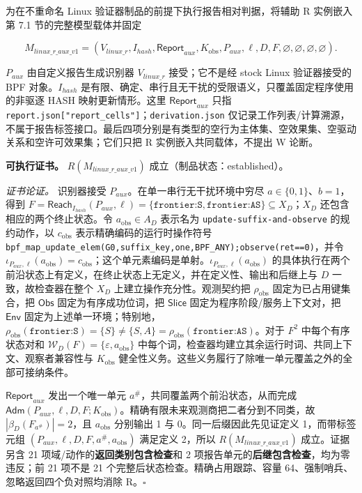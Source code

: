 \documentclass[
  11pt,
  a4paper,
]{ctexart}
\begin{document}
为在不重命名 Linux 验证器制品的前提下执行报告相对判据，将辅助 R
实例嵌入第 7.1 节的完整模型载体并固定

\[M_{\mathit{linux\_r\_aux\_v1}}=
(V_{\mathit{linux\_r}},I_{\mathit{hash}},\mathsf{Report}_{\mathit{aux}},
K_{\mathrm{obs}},P_{\mathit{aux}},\ell,D,F,
\varnothing,\varnothing,\varnothing,\varnothing).\]

\(P_{\mathit{aux}}\) 由自定义报告生成识别器 \(V_{\mathit{linux\_r}}\)
接受；它不是经 stock Linux 验证器接受的 BPF 对象。\(I_{\mathit{hash}}\)
是有限、确定、串行且无干扰的受限语义，只覆盖固定程序使用的非驱逐 HASH
映射更新情形。这里 \(\mathsf{Report}_{\mathit{aux}}\) 只指
\texttt{report.json{[}"report\_cells"{]}}；\texttt{derivation.json}
仅记录工作列表/计算溯源，不属于报告标签接口。最后四项分别是有类型的空行为主体集、空效果集、空驱动关系和空许可效果集；它们只把
R 实例嵌入共同载体，不提出 W 论断。

\textbf{可执行证书。} \(R(M_{\mathit{linux\_r\_aux\_v1}})\)
成立（制品状态：established）。

\emph{证书论证。} 识别器接受
\(P_{\mathit{aux}}\)。在单一串行无干扰环境中穷尽
\(a\in\{0,1\}\)、\(b=1\)，得到
\(F=\mathsf{Reach}_{I_{\mathit{hash}}}(P_{\mathit{aux}},\ell)
=\{\texttt{frontier:S},\texttt{frontier:AS}\}\subseteq X_D\)；\(X_D\)
还包含相应的两个终止状态。令 \(a_{\mathrm{obs}}\in A_D\) 表示名为
\texttt{update-suffix-and-observe} 的规约动作，以 \(c_{\mathrm{obs}}\)
表示精确编码的运行时操作符号
\texttt{bpf\_map\_update\_elem(G0,suffix\_key,one,BPF\_ANY);observe(ret==0)}，并令
\(\iota_{P_{\mathit{aux}},\ell}(a_{\mathrm{obs}})=c_{\mathrm{obs}}\)；这个单元素编码是单射。\(\iota_{P_{\mathit{aux}},\ell}(a_{\mathrm{obs}})\)
的具体执行在两个前沿状态上有定义，在终止状态上无定义，并在定义性、输出和后继上与
\(D\) 一致，故检查器在整个 \(X_D\) 上建立操作充分性。观测契约把
\(\rho_{\mathrm{obs}}\) 固定为已占用键集合，把 \(\mathsf{Obs}\)
固定为有序成功位词，把 \(\mathsf{Slice}\)
固定为程序阶段/服务上下文对，把 \(\mathsf{Env}\)
固定为上述单一环境；特别地，\(\rho_{\mathrm{obs}}(\texttt{frontier:S})=\{S\}\ne\{S,A\}=\rho_{\mathrm{obs}}(\texttt{frontier:AS})\)。对于
\(F^2\) 中每个有序状态对和
\(\mathcal W_D(F)=\{\varepsilon,a_{\mathrm{obs}}\}\)
中每个词，检查器均建立其余运行时词、共同上下文、观察者兼容性与
\(K_{\mathrm{obs}}\)
健全性义务。这些义务履行了除唯一单元覆盖之外的全部可接纳条件。

\(\mathsf{Report}_{\mathit{aux}}\) 发出一个唯一单元
\(a^\#\)，共同覆盖两个前沿状态，从而完成
\(\mathsf{Adm}(P_{\mathit{aux}},\ell,D,F;K_{\mathrm{obs}})\)。精确有限未来观测商把二者分到不同类，故
\(|\beta_D(F_{a^\#})|=2\)，且 \(a_{\mathrm{obs}}\) 分别输出 1 与
0。同一后缀因此先见证定义 1，而带标签元组
\((P_{\mathit{aux}},\ell,D,F,a^\#,a_{\mathrm{obs}})\) 满足定义 2，所以
\(R(M_{\mathit{linux\_r\_aux\_v1}})\) 成立。证据另含 21
项域/动作的\textbf{返回类别包含检查}和 2
项报告单元的\textbf{后继包含检查}，均为零违反；前 21 项不是 21
个完整后状态检查。精确占用跟踪、容量
64、强制哨兵、忽略返回四个负对照均消除 R。\(\square\)
\end{document}
